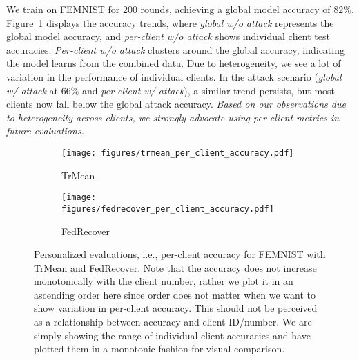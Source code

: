We train on FEMNIST for 200 rounds, achieving a global model accuracy of $82\%$. Figure~\ref{fig:trmean_per_client_acc} displays the accuracy trends, where \emph{global w/o attack} represents the global model accuracy, and \emph{per-client w/o attack} shows individual client test accuracies. \emph{Per-client w/o attack} clusters around the global accuracy, indicating the model learns from the combined data. Due to heterogeneity, we see a lot of variation in the performance of individual clients. In the attack scenario (\emph{global w/ attack} at $66\%$ and \emph{per-client w/ attack}), a similar trend persists, but most clients now fall below the global attack accuracy.
\emph{Based on our observations due to heterogeneity across clients, we strongly advocate using per-client metrics in future evaluations.}

\begin{figure}[t]
    \centering
    \begin{subfigure}[b]{0.43\columnwidth}
        \texttt{[image: figures/trmean\_per\_client\_accuracy.pdf]}
        \caption{TrMean}
        \label{fig:trmean_per_client_acc}
    \end{subfigure}
    \begin{subfigure}[b]{0.43\columnwidth}
        \texttt{[image: figures/fedrecover\_per\_client\_accuracy.pdf]}
        \caption{FedRecover}
        \label{fig:fedrecover_per_client_acc}
    \end{subfigure}
    \caption{Personalized evaluations, i.e., per-client accuracy for FEMNIST with TrMean and FedRecover. Note that the accuracy does not increase monotonically with the client number, rather we plot it in an ascending order here since order does not matter when we want to show variation in per-client accuracy. This should not be perceived as a relationship between accuracy and client ID/number. We are simply showing the range of individual client accuracies and have plotted them in a monotonic fashion for visual comparison.}
    \label{fig:per_client_acc}
\end{figure}

